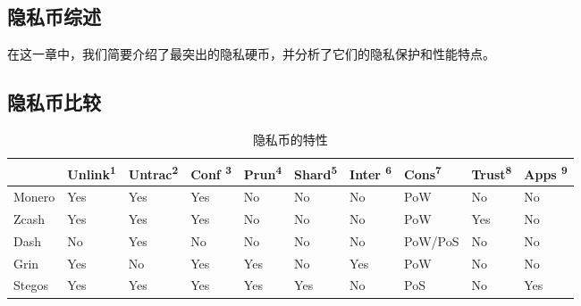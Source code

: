 \documentclass[8pt,fleqn,openany]{book}
\begin{document}
\begin{CJK*}{UTF8}{gbsn}
{\chapter{隐私币综述}\label{app:privacy-coins}

在这一章中，我们简要介绍了最突出的隐私硬币，并分析了它们的隐私保护和性能特点。

\section{隐私币比较}

\begin{table}[ht!]
\centering
\begin{tabular}{llllllllll}
	\toprule[2pt] 
	{} & Unlink\textsuperscript{1}
	& Untrac\textsuperscript{2} & Conf \textsuperscript{3} & Prun\textsuperscript{4} & Shard\textsuperscript{5} & Inter \textsuperscript{6} & Cons\textsuperscript{7} & Trust\textsuperscript{8} & Apps \textsuperscript{9} \\
	\midrule[2pt]
	Monero & Yes & Yes & Yes & No & No & No & PoW & No & No \\
	Zcash  & Yes & Yes & Yes & No  & No & No & PoW & Yes & No \\
	Dash   & No  & Yes & No  & No  & No & No & PoW/PoS & No & No \\
	Grin   & Yes & No  & Yes & Yes & No & Yes & PoW & No & No \\
	Stegos & Yes & Yes & Yes & Yes & Yes & No & PoS & No  & Yes \\
	\bottomrule[2pt]
\end{tabular}
\caption{隐私币的特性} 
\end{table}

}
\end{CJK*}
\end{document}
